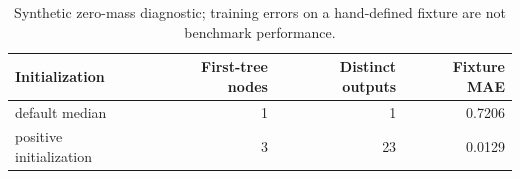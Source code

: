 \begin{table}[htbp]\centering\small
\caption{Synthetic zero-mass diagnostic; training errors on a hand-defined fixture are not benchmark performance.}
\begin{tabular}{lrrr}
\toprule
Initialization & First-tree nodes & Distinct outputs & Fixture MAE \\
\midrule
default median & 1 & 1 & 0.7206 \\
positive initialization & 3 & 23 & 0.0129 \\
\bottomrule
\end{tabular}\end{table}
